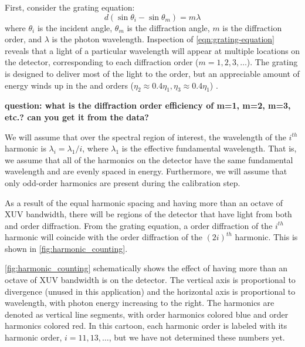 First, consider the grating equation:
\begin{equation}
d (\sin \theta_i - \sin \theta_m) = m \lambda
\label{eqn:grating-equation}
\end{equation}
where $\theta_i$ is the incident angle, $\theta_m$ is the diffraction angle, $m$ is the diffraction order, and $\lambda$ is the photon wavelength. Inspection of \cref{eqn:grating-equation} reveals that a light of a particular wavelength will appear at multiple locations on the detector, corresponding to each diffraction order ($m=1, 2, 3, \dots$). The grating is designed to deliver most of the light to the  order, but an appreciable amount of energy winds up in the  and  orders ($\eta_2 \approx 0.4 \eta_1, \eta_3 \approx 0.4 \eta_1$) \cite{obryanHighResolutionXUV2015,hagemanComplexAttosecondTransientAbsorption2020}.

\textbf{question: what is the diffraction order efficiency of m=1, m=2, m=3, etc.? can you get it from the data?}

We will assume that over the spectral region of interest, the wavelength of the $i^{th}$ harmonic is $\lambda_i = \lambda_1 / i$, where $\lambda_1$ is the effective fundamental wavelength. That is, we assume that all of the harmonics on the detector have the same fundamental wavelength and are evenly spaced in energy. Furthermore, we will assume that only odd-order harmonics are present during the calibration step.

As a result of the equal harmonic spacing and having more than an octave of XUV bandwidth, there will be regions of the detector that have light from both  and  order diffraction. From the grating equation, a  order diffraction of the $i^{th}$ harmonic will coincide with the  order diffraction of the $(2i)^{th}$ harmonic. This is shown in \cref{fig:harmonic_counting}.

\cref{fig:harmonic_counting} schematically shows the effect of having more than an octave of XUV bandwidth is on the detector. The vertical axis is proportional to divergence (unused in this application) and the horizontal axis is proportional to wavelength, with photon energy increasing to the right. The harmonics are denoted as vertical line segments, with  order harmonics colored blue and  order harmonics colored red. In this cartoon, each harmonic order is labeled with its harmonic order, $i = 11, 13, \dots$, but we have not determined these numbers yet.

